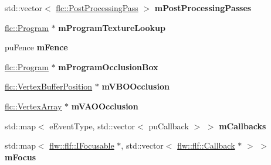 \begin{DoxyCompactItemize}
\item 
std\+::vector$<$ \hyperlink{classflw_1_1flc_1_1PostProcessingPass}{flc\+::\+Post\+Processing\+Pass} $>$ {\bfseries m\+Post\+Processing\+Passes}\hypertarget{structflw_1_1Engine_1_1EngineImpl_ac028462557eb57a124aa1850f091d3a1}{}\label{structflw_1_1Engine_1_1EngineImpl_ac028462557eb57a124aa1850f091d3a1}

\item 
\hyperlink{classflw_1_1flc_1_1Program}{flc\+::\+Program} $\ast$ {\bfseries m\+Program\+Texture\+Lookup}\hypertarget{structflw_1_1Engine_1_1EngineImpl_a7fd86a72c8c44afcb8906ef16acb9203}{}\label{structflw_1_1Engine_1_1EngineImpl_a7fd86a72c8c44afcb8906ef16acb9203}

\item 
pu\+Fence {\bfseries m\+Fence}\hypertarget{structflw_1_1Engine_1_1EngineImpl_ad7e5571888988906b05acc66cc882db2}{}\label{structflw_1_1Engine_1_1EngineImpl_ad7e5571888988906b05acc66cc882db2}

\item 
\hyperlink{classflw_1_1flc_1_1Program}{flc\+::\+Program} $\ast$ {\bfseries m\+Program\+Occlusion\+Box}\hypertarget{structflw_1_1Engine_1_1EngineImpl_a89ed97e3c49f24dad22d9bdc9c9433ce}{}\label{structflw_1_1Engine_1_1EngineImpl_a89ed97e3c49f24dad22d9bdc9c9433ce}

\item 
\hyperlink{classflw_1_1flc_1_1VertexBufferPosition}{flc\+::\+Vertex\+Buffer\+Position} $\ast$ {\bfseries m\+V\+B\+O\+Occlusion}\hypertarget{structflw_1_1Engine_1_1EngineImpl_a9bd419c639d5401878c52c25b18b3df0}{}\label{structflw_1_1Engine_1_1EngineImpl_a9bd419c639d5401878c52c25b18b3df0}

\item 
\hyperlink{classflw_1_1flc_1_1VertexArray}{flc\+::\+Vertex\+Array} $\ast$ {\bfseries m\+V\+A\+O\+Occlusion}\hypertarget{structflw_1_1Engine_1_1EngineImpl_a1f7b14725bc12003f7598f54d6e9ed65}{}\label{structflw_1_1Engine_1_1EngineImpl_a1f7b14725bc12003f7598f54d6e9ed65}

\item 
std\+::map$<$ e\+Event\+Type, std\+::vector$<$ pu\+Callback $>$ $>$ {\bfseries m\+Callbacks}\hypertarget{structflw_1_1Engine_1_1EngineImpl_a1c6bd99e720ce644a9a8227b30cc8e6f}{}\label{structflw_1_1Engine_1_1EngineImpl_a1c6bd99e720ce644a9a8227b30cc8e6f}

\item 
std\+::map$<$ \hyperlink{classflw_1_1flf_1_1IFocusable}{flw\+::flf\+::\+I\+Focusable} $\ast$, std\+::vector$<$ \hyperlink{classflw_1_1flf_1_1Callback}{flw\+::flf\+::\+Callback} $\ast$ $>$ $>$ {\bfseries m\+Focus}\hypertarget{structflw_1_1Engine_1_1EngineImpl_a209d8a61d630123ec8f21b980428516e}{}\label{structflw_1_1Engine_1_1EngineImpl_a209d8a61d630123ec8f21b980428516e}


\end{DoxyCompactItemize}
